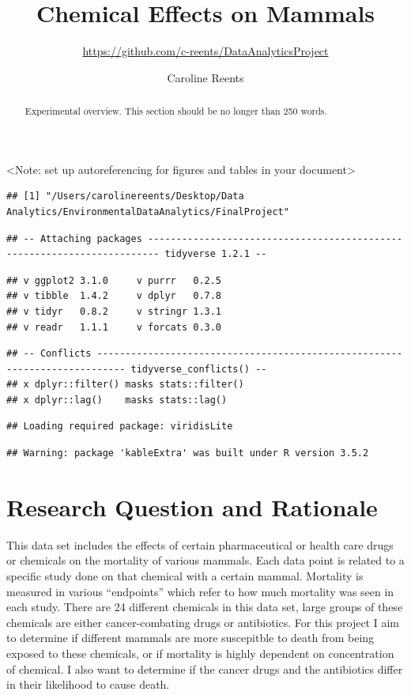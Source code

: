 \documentclass[12pt,]{article}
\title{Chemical Effects on Mammals}
\subtitle{\url{https://github.com/c-reents/DataAnalyticsProject}}
\author{Caroline Reents}
\date{}
\begin{document}
\maketitle
\begin{abstract}
Experimental overview. This section should be no longer than 250 words.
\end{abstract}

\newpage

\tableofcontents  \newpage
\listoftables  \newpage
\listoffigures  \newpage

\textless{}Note: set up autoreferencing for figures and tables in your
document\textgreater{}

\begin{verbatim}
## [1] "/Users/carolinereents/Desktop/Data Analytics/EnvironmentalDataAnalytics/FinalProject"
\end{verbatim}

\begin{verbatim}
## -- Attaching packages ------------------------------------------------------------------------ tidyverse 1.2.1 --
\end{verbatim}

\begin{verbatim}
## v ggplot2 3.1.0     v purrr   0.2.5
## v tibble  1.4.2     v dplyr   0.7.8
## v tidyr   0.8.2     v stringr 1.3.1
## v readr   1.1.1     v forcats 0.3.0
\end{verbatim}

\begin{verbatim}
## -- Conflicts --------------------------------------------------------------------------- tidyverse_conflicts() --
## x dplyr::filter() masks stats::filter()
## x dplyr::lag()    masks stats::lag()
\end{verbatim}

\begin{verbatim}
## Loading required package: viridisLite
\end{verbatim}

\begin{verbatim}
## Warning: package 'kableExtra' was built under R version 3.5.2
\end{verbatim}

\section{Research Question and
Rationale}\label{research-question-and-rationale}

This data set includes the effects of certain pharmaceutical or health
care drugs or chemicals on the mortality of various mammals. Each data
point is related to a specific study done on that chemical with a
certain mammal. Mortality is measured in various ``endpoints'' which
refer to how much mortality was seen in each study. There are 24
different chemicals in this data set, large groups of these chemicals
are either cancer-combating drugs or antibiotics. For this project I aim
to determine if different mammals are more suscepitble to death from
being exposed to these chemicals, or if mortality is highly dependent on
concentration of chemical. I also want to determine if the cancer drugs
and the antibiotics differ in their likelihood to cause death.
\end{document}
